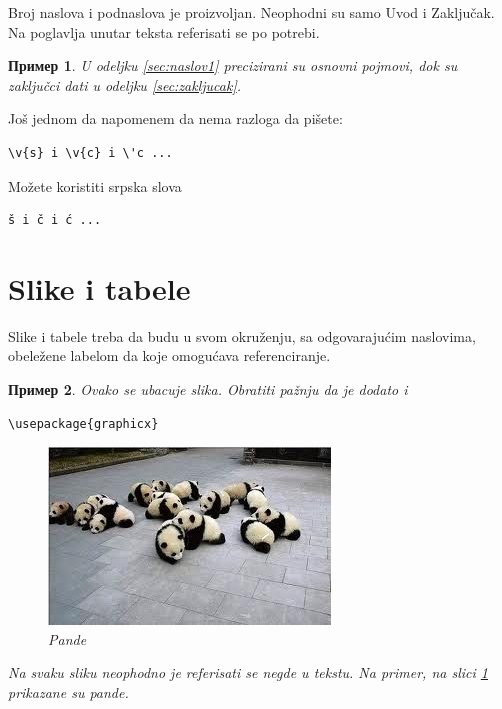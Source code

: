 \documentclass[a4paper]{article}
\newtheorem{primer}{Пример}[section] %
\begin{document}
Broj naslova i podnaslova je proizvoljan. Neophodni su samo Uvod i Zaključak. Na poglavlja unutar teksta referisati se po potrebi. 
\begin{primer}
U odeljku \ref{sec:naslov1} precizirani su osnovni pojmovi, dok su zaključci dati u odeljku \ref{sec:zakljucak}.
\end{primer}

Još jednom da napomenem da nema razloga da pišete:
\begin{verbatim}
\v{s} i \v{c} i \'c ...
\end{verbatim}
Možete koristiti srpska slova
\begin{verbatim}
š i č i ć ... 
\end{verbatim}



\section{Slike i tabele}
\label{slike_i_tabele}

Slike i tabele treba da budu u svom okruženju, sa odgovarajućim naslovima, obeležene labelom da koje omogućava referenciranje. 

\begin{primer} Ovako se ubacuje slika. Obratiti pažnju da je dodato i 
\begin{verbatim}
\usepackage{graphicx}
\end{verbatim}

\begin{figure}[h!]
\begin{center}
\includegraphics[scale=0.75]{panda.jpg}
\end{center}
\caption{Pande}
\label{fig:pande}
\end{figure}

Na svaku sliku neophodno je referisati se negde u tekstu. Na primer, na slici \ref{fig:pande} prikazane su pande. 
\end{primer}
\end{document}
